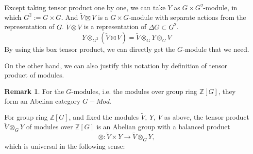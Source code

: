 \documentclass[12pt,a4paper,english]{article}
\theoremstyle{plain}
\theoremstyle{definition}
\newtheorem*{rem}{Remark}
\begin{document}
Except taking tensor product one by one, we can take $Y$ as $G\times G^{2}$-module, in which $G^{2}:=G\times G$. And $\widetilde{V}\boxtimes V$ is a $G\times G$-module with separate actions from the representation of $G$. $\tilde{V}\otimes V$ is a representation of $\Delta G\subset G^{2}$.
\begin{equation*}
    Y\otimes_{G^{2}} (\widetilde{V}\boxtimes V)=\widetilde{V}\otimes_{G} Y\otimes_{G} V
\end{equation*}
By using this box tensor product, we can directly get the $G$-module that we need.

On the other hand, we can also justify this notation by definition of tensor product of modules. 
\begin{rem}
For the $G$-modules, i.e. the modules over group ring $\mathbb{Z}[G]$, they form an Abelian category $G-Mod$.
\end{rem}
For group ring $\mathbb{Z}[G]$, and fixed the modules $\widetilde{V},\ Y,\ V$ as above, the tensor product $\widetilde{V}\otimes_{G}Y$ of modules over $\mathbb{Z}[G]$ is an Abelian group with a balanced product 
\begin{equation*}
    \otimes: \widetilde{V}\times Y\rightarrow \widetilde{V}\otimes_{G}Y,
\end{equation*}
which is universal in the following sense:
\begin{center}
\end{center}
\end{document}
